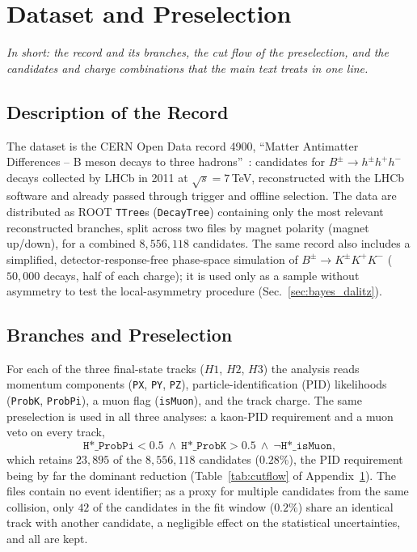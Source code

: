 \appendix
\makeatletter{}\makeatother
\makeatletter\renewcommand{}\makeatother
\section{Dataset and Preselection}
\label{app:ext_data}
\emph{In short: the record and its branches, the cut flow of the preselection, and the candidates and charge combinations that the main text treats in one line.}

\subsection{Description of the Record}
The dataset is the CERN Open Data record 4900, ``Matter Antimatter Differences -- B meson decays to three hadrons''~\cite{opendata_record}: candidates for $B^{\pm}\to h^{\pm}h^{+}h^{-}$ decays collected by LHCb in 2011 at $\sqrt{s}=7$\,TeV, reconstructed with the LHCb software and already passed through trigger and offline selection. The data are distributed as ROOT \texttt{TTree}s (\texttt{DecayTree}) containing only the most relevant reconstructed branches, split across two files by magnet polarity (magnet up/down), for a combined $8{,}556{,}118$ candidates. The same record also includes a simplified, detector-response-free phase-space simulation of $B^{\pm}\to K^{\pm}K^{+}K^{-}$ ($50{,}000$ decays, half of each charge); it is used only as a sample without asymmetry to test the local-asymmetry procedure (Sec.~\ref{sec:bayes_dalitz}).

\subsection{Branches and Preselection}
For each of the three final-state tracks ($H1$, $H2$, $H3$) the analysis reads momentum components (\texttt{PX}, \texttt{PY}, \texttt{PZ}), particle-identification (PID) likelihoods (\texttt{ProbK}, \texttt{ProbPi}), a muon flag (\texttt{isMuon}), and the track charge. The same preselection is used in all three analyses: a kaon-PID requirement and a muon veto on every track,
\[
\texttt{H*\_ProbPi} < 0.5 \ \wedge\ \texttt{H*\_ProbK} > 0.5 \ \wedge\ \lnot\texttt{H*\_isMuon},
\]
which retains $23{,}895$ of the $8{,}556{,}118$ candidates ($0.28\%$), the PID requirement being by far the dominant reduction (Table~\ref{tab:cutflow} of Appendix~\ref{app:ext_data}). The files contain no event identifier; as a proxy for multiple candidates from the same collision, only $42$ of the candidates in the fit window ($0.2\%$) share an identical track with another candidate, a negligible effect on the statistical uncertainties, and all are kept.

